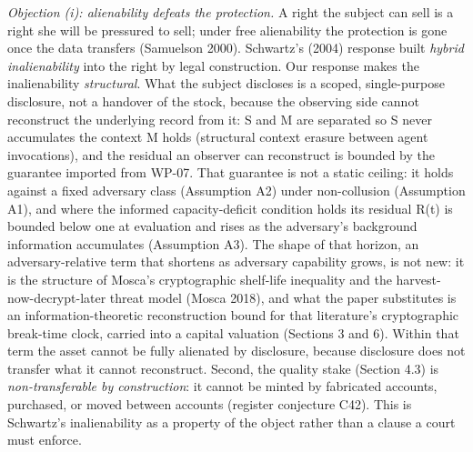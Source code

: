 \documentclass[
  11pt,
]{article}
\begin{document}
\emph{Objection (i): alienability defeats the protection.} A right the
subject can sell is a right she will be pressured to sell; under free
alienability the protection is gone once the data transfers (Samuelson
2000). Schwartz's (2004) response built \emph{hybrid inalienability}
into the right by legal construction. Our response makes the
inalienability \emph{structural}. What the subject discloses is a
scoped, single-purpose disclosure, not a handover of the stock, because
the observing side cannot reconstruct the underlying record from it: S
and M are separated so S never accumulates the context M holds
(structural context erasure between agent invocations), and the residual
an observer can reconstruct is bounded by the guarantee imported from
WP-07. That guarantee is not a static ceiling: it holds against a fixed
adversary class (Assumption A2) under non-collusion (Assumption A1), and
where the informed capacity-deficit condition holds its residual R(t) is
bounded below one at evaluation and rises as the adversary's background
information accumulates (Assumption A3). The shape of that horizon, an
adversary-relative term that shortens as adversary capability grows, is
not new: it is the structure of Mosca's cryptographic shelf-life
inequality and the harvest-now-decrypt-later threat model (Mosca 2018),
and what the paper substitutes is an information-theoretic
reconstruction bound for that literature's cryptographic break-time
clock, carried into a capital valuation (Sections 3 and 6). Within that
term the asset cannot be fully alienated by disclosure, because
disclosure does not transfer what it cannot reconstruct. Second, the
quality stake (Section 4.3) is \emph{non-transferable by construction}:
it cannot be minted by fabricated accounts, purchased, or moved between
accounts (register conjecture C42). This is Schwartz's inalienability as
a property of the object rather than a clause a court must enforce.
\end{document}
